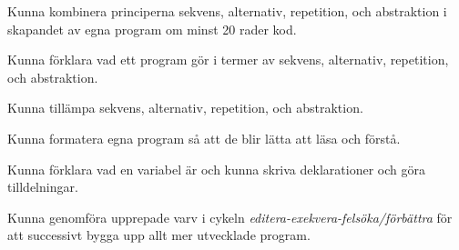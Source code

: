 
\item Kunna kombinera principerna sekvens, alternativ, repetition, och abstraktion i skapandet av egna program om minst 20 rader kod.
\item Kunna förklara vad ett program gör i termer av sekvens, alternativ, repetition, och abstraktion.
\item Kunna tillämpa sekvens, alternativ, repetition, och abstraktion.
\item Kunna formatera egna program så att de blir lätta att läsa och förstå.
\item Kunna förklara vad en variabel är och kunna skriva deklarationer och göra tilldelningar.
\item Kunna genomföra upprepade varv i cykeln \emph{editera-exekvera-felsöka/förbättra} för att successivt bygga upp allt mer utvecklade program.
